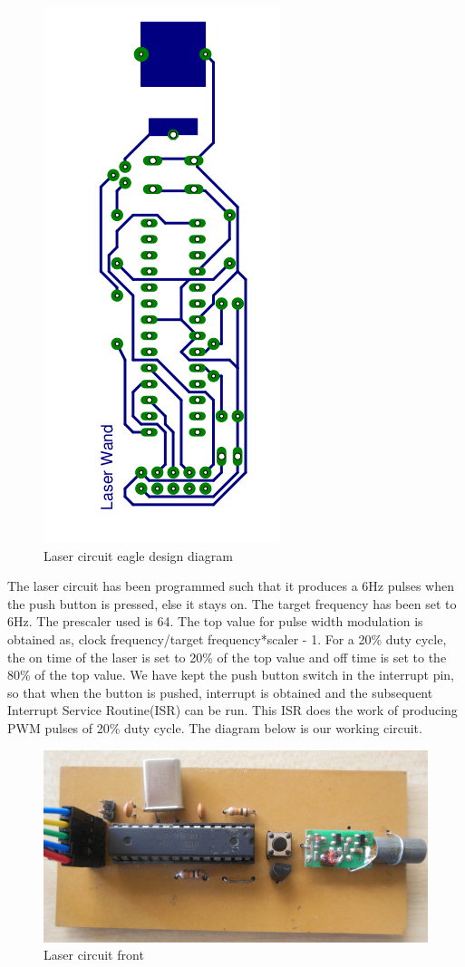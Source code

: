 \documentclass[12pt, a4paper]{article}
\begin{document}
\begin{figure}[htp]
	\centering
	\includegraphics[scale=0.20]{eagle-non-mirror.png}
	\caption{Laser circuit eagle design diagram}
	\label{}
\end{figure}

	The laser circuit has been programmed such that it produces a 6Hz pulses when the push button is pressed, else it stays on. The target frequency has been set to 6Hz. The prescaler used is 64. The top value for pulse width modulation is obtained as, clock frequency/target frequency*scaler - 1. For a 20\% duty cycle, the on time of the laser is set to 20\% of the top value and off time is set to the 80\% of the top value. We have kept the push button switch in the interrupt pin, so that when the button is pushed, interrupt is obtained and the subsequent Interrupt Service Routine(ISR) can be run. This ISR does the work of producing PWM pulses of 20\% duty cycle. The diagram below is our working circuit.

\begin{figure}[htp]
	\centering
	\includegraphics[scale=0.15]{front.png}
	\caption{Laser circuit front}
	\label{}
\end{figure}
\end{document}
